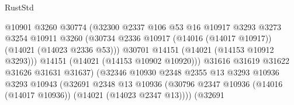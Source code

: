 \begin{lexlean}{RustStd}
\begin{coremodule}
                                            @10901
                                            @3260
                                            @30774
                                            (@32300
                                              @2337
                                              @106
                                              @53
                                              @16
                                              @10917
                                              @3293
                                              @3273
                                              @3254
                                              @10911
                                              @3260
                                              (@30734
                                                @2336
                                                @10917
                                                (@14016 (@14017 @10917))
                                                (@14021 (@14023 @2336 @53)))
                                              @30701
                                              @14151
                                              (@14021 (@14153 @10912 @3293)))
                                            @14151
                                            (@14021 (@14153 @10902 @10920)))
                                          @31616
                                          @31619
                                          @31622
                                          @31626
                                          @31631
                                          @31637)
                                        (@32346
                                          @10930
                                          @2348
                                          @2355
                                          @13
                                          @3293
                                          @10936
                                          @3293
                                          @10943
                                          (@32691
                                            @2348
                                            @13
                                            @10936
                                            (@30796
                                              @2347
                                              @10936
                                              (@14016 (@14017 @10936))
                                              (@14021 (@14023 @2347 @13))))
                                          (@32691

\end{coremodule}
\end{lexlean}
